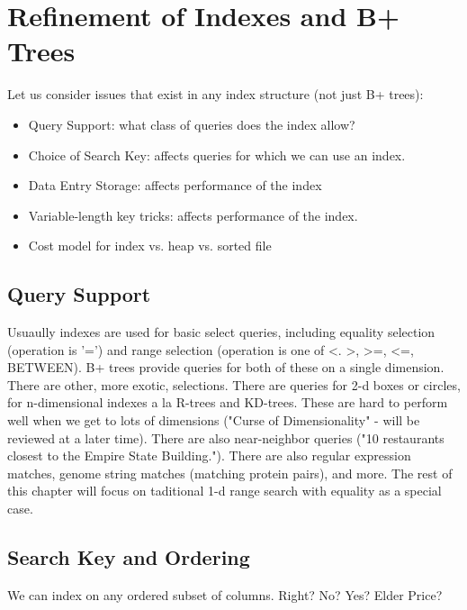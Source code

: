 \documentclass[10pt,a4paper]{book}
\begin{document}
\chapter{Refinement of Indexes and B+ Trees}
Let us consider issues that exist in any index structure (not just B+ trees):
\begin{itemize}
  \item Query Support: what class of queries does the index allow?
  \item Choice of Search Key: affects queries for which we can use an index.
  \item Data Entry Storage: affects performance of the index
  \item Variable-length key tricks: affects performance of the index.
  \item Cost model for index vs. heap vs. sorted file
\end{itemize}
\section{Query Support}
Usuaully indexes are used for basic select queries, including equality selection (operation is '=') and range selection (operation is one of <. >, >=, <=, BETWEEN). B+ trees provide queries for both of these on a single dimension.
There are other, more exotic, selections. There are queries for 2-d boxes or circles, for n-dimensional indexes a la R-trees and KD-trees. These are hard to perform well when we get to lots of dimensions ("Curse of Dimensionality" - will be reviewed at a later time). There are also near-neighbor queries ("10 restaurants closest to the Empire State Building."). There are also regular expression matches, genome string matches (matching protein pairs), and more. The rest of this chapter will focus on taditional 1-d range search with equality as a special case.
\section{Search Key and Ordering}
We can index on any ordered subset of columns. Right? No? Yes? Elder Price?
\end{document}
